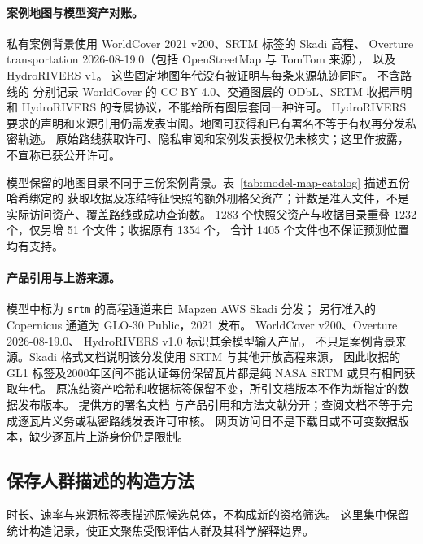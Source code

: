 \documentclass[UTF8,11pt]{ctexart}
\begin{document}
\paragraph{案例地图与模型资产对账。}
私有案例背景使用 WorldCover 2021 v200\cite{worldcover2021}、SRTM 标签的 Skadi 高程\cite{mapzenterrain}、
Overture transportation 2026-08-19.0（包括 OpenStreetMap 与 TomTom 来源）\cite{overture202608,overtureattribution}，
以及 HydroRIVERS v1\cite{hydrorivers2013,hydroriverslicense}。
这些固定地图年代没有被证明与每条来源轨迹同时。
不含路线的  分别记录
WorldCover 的 CC BY 4.0、交通图层的 ODbL、SRTM 收据声明和 HydroRIVERS 的专属协议，不能给所有图层套同一种许可。
HydroRIVERS 要求的声明和来源引用仍需发表审阅。地图可获得和已有署名不等于有权再分发私密轨迹。
原始路线获取许可、隐私审阅和案例发表授权仍未核实；这里作披露，不宣称已获公开许可。

模型保留的地图目录不同于三份案例背景。表~\ref{tab:model-map-catalog} 描述五份哈希绑定的
获取收据及冻结特征快照的额外栅格父资产；计数是准入文件，不是实际访问资产、覆盖路线或成功查询数。
1283 个快照父资产与收据目录重叠 1232 个，仅另增 51 个文件；收据原有 1354 个，
合计 1405 个文件也不保证预测位置均有支持。

\paragraph{产品引用与上游来源。}
模型中标为 \texttt{srtm} 的高程通道来自 Mapzen AWS Skadi 分发\cite{mapzenterrain}；
另行准入的 Copernicus 通道为 GLO-30 Public，2021 发布\cite{copernicusdem2021}。
WorldCover v200\cite{worldcover2021}、Overture 2026-08-19.0\cite{overture202608}、
HydroRIVERS v1.0\cite{hydrorivers2013,hydroriverslicense} 标识其余模型输入产品，
不只是案例背景来源。Skadi 格式文档说明该分发使用 SRTM 与其他开放高程来源，
因此收据的 GL1 标签及2000年区间不能认证每份保留瓦片都是纯 NASA SRTM 或具有相同获取年代。
原冻结资产哈希和收据标签保留不变，所引文档版本不作为新指定的数据发布版本。
提供方的署名文档\cite{mapzenattribution,overtureattribution,hydroriverslicense}
与产品引用和方法文献分开；查阅文档不等于完成逐瓦片义务或私密路线发表许可审核。
网页访问日不是下载日或不可变数据版本，缺少逐瓦片上游身份仍是限制。

\subsection{保存人群描述的构造方法}
\label{sec:population-description-construction}
时长、速率与来源标签表描述原候选总体，不构成新的资格筛选。
这里集中保留统计构造记录，使正文聚焦受限评估人群及其科学解释边界。
\end{document}
